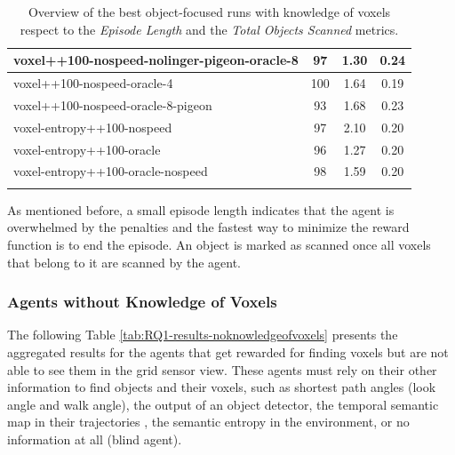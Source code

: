 \begin{longtable}{|l|c|c|c|}
voxel++100-nospeed-nolinger-pigeon-oracle-8 & 97 & {\cellcolor[HTML]{E6F0EE}} \color[HTML]{000000} 1.30 &                        0.24 \\ \hline
voxel++100-nospeed-oracle-4 & 100 & {\cellcolor[HTML]{A9D2CA}} \color[HTML]{000000} 1.64 &                       0.19 \\ \hline
voxel++100-nospeed-oracle-8-pigeon & 93 & {\cellcolor[HTML]{A1CFC5}} \color[HTML]{000000} 1.68 &                         0.23 \\ \hline
voxel-entropy++100-nospeed & 97 & {\cellcolor[HTML]{55AA99}} \color[HTML]{000000} 2.10 &                         0.20 \\ \hline
voxel-entropy++100-oracle & 96 & {\cellcolor[HTML]{EBF2F0}} \color[HTML]{000000} 1.27 &                          0.20 \\ \hline
voxel-entropy++100-oracle-nospeed & 98 & {\cellcolor[HTML]{B1D6CE}} \color[HTML]{000000} 1.59 &                          0.20 \\ \hline

    \caption{Overview of the best object-focused runs with knowledge of voxels respect to the \textit{Episode Length} and the \textit{Total Objects Scanned} metrics.
    } \label{tab:RQ1-results}
\end{longtable}

As mentioned before, a small episode length indicates that the agent is overwhelmed by the penalties and the fastest way to minimize the reward function is to end the episode. An object is marked as scanned once all voxels that belong to it are scanned by the agent.
\newpage
\subsubsection{Agents without Knowledge of Voxels}
The following Table \ref{tab:RQ1-results-noknowledgeofvoxels} presents the aggregated results for the agents that get rewarded for finding voxels but are not able to see them in the grid sensor view. These agents must rely on their other information to find objects and their voxels, such as shortest path angles (look angle and walk angle), the output of an object detector, the temporal semantic map in their trajectories \cite{chaplot2020semantic}, the semantic entropy in the environment, or no information at all (blind agent).

